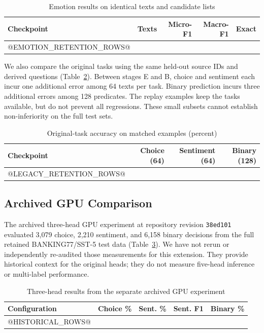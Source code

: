 \documentclass[conference]{IEEEtran}
\begin{document}
\begin{table}[!t]
\caption{Emotion results on identical texts and candidate lists}
\label{tab:emotionretention}
\centering\footnotesize\setlength{\tabcolsep}{4pt}
\begin{tabular}{lrrrr}\toprule
Checkpoint & Texts & Micro-F1 & Macro-F1 & Exact\\\midrule
@EMOTION_RETENTION_ROWS@
\bottomrule\end{tabular}
\end{table}

We also compare the original tasks using the same held-out source IDs and derived questions (Table~\ref{tab:legacyretention}). Between stages E and B, choice and sentiment each incur one additional error among 64 texts per task. Binary prediction incurs three additional errors among 128 predicates. The replay examples keep the tasks available, but do not prevent all regressions. These small subsets cannot establish non-inferiority on the full test sets.

\begin{table}[!t]
\caption{Original-task accuracy on matched examples (percent)}
\label{tab:legacyretention}
\centering\footnotesize\setlength{\tabcolsep}{4pt}
\begin{tabular}{lrrr}\toprule
Checkpoint & Choice (64) & Sentiment (64) & Binary (128)\\\midrule
@LEGACY_RETENTION_ROWS@
\bottomrule\end{tabular}
\end{table}

\subsection{Archived GPU Comparison}
The archived three-head GPU experiment at repository revision \texttt{38ed101} evaluated 3,079 choice, 2,210 sentiment, and 6,158 binary decisions from the full retained BANKING77/SST-5 test data (Table~\ref{tab:historical}). We have not rerun or independently re-audited those measurements for this extension. They provide historical context for the original heads; they do not measure five-head inference or multi-label performance.

\begin{table}[!t]
\caption{Three-head results from the separate archived GPU experiment}
\label{tab:historical}
\centering\scriptsize\setlength{\tabcolsep}{2.5pt}
\begin{tabular}{lrrrr}\toprule
Configuration & Choice \% & Sent. \% & Sent. F1 & Binary \%\\\midrule
@HISTORICAL_ROWS@
\bottomrule\end{tabular}
\end{table}
\end{document}
